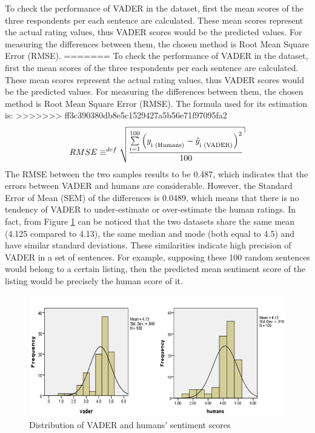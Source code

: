 To check the performance of VADER in the dataset, first the mean scores of the three respondents per each sentence are calculated. These mean scores represent the actual rating values, thus VADER scores would  be the predicted values.  For measuring the differences between them, the chosen method is Root Mean Square Error (RMSE).
=======
To check the performance of VADER in the dataset, first the mean scores of the three respondents per each sentence are calculated. These mean scores represent the actual rating values, thus VADER scores would  be the predicted values.  For measuring the differences between them, the chosen method is Root Mean Square Error (RMSE). The formula used for its estimation is:
>>>>>>> ff3c390380db8e5c1529427a5b56e71f97095fa2
\begin{equation}
 RMSE \equiv^{def} \sqrt {{\frac{{\sum\limits_{{i = 1}}^{100} {{{\left( {{y_\textsubscript{i (Humans)}} - {{\hat{y}}_\textsubscript{i (VADER)}}} \right)}^2}} }}{{100}}}}
 \label{RMSE}
\end{equation}
The RMSE between the two samples results to be 0.487, which indicates that the errors between VADER and humans are considerable. However, the Standard Error of Mean (SEM) of the differences is 0.0489, which means that there is no tendency of VADER to under-estimate or over-estimate the human ratings. In fact, from Figure \ref{fig:distribution} can be noticed that the two datasets share the same mean (4.125 compared to 4.13), the same median and mode (both equal to 4.5) and have similar standard deviations. These similarities indicate high precision of VADER in a set of sentences. For example, supposing these 100 random sentences would belong to a certain listing, then the predicted mean sentiment score of the listing would be precisely the human score of it. 
\begin{figure}[h!]
	\centering
	\includegraphics[height=0.33\textheight]{graphs_vader_humans}
	\caption{Distribution of VADER and humans' sentiment scores}
	\label{fig:distribution}
\end{figure}

